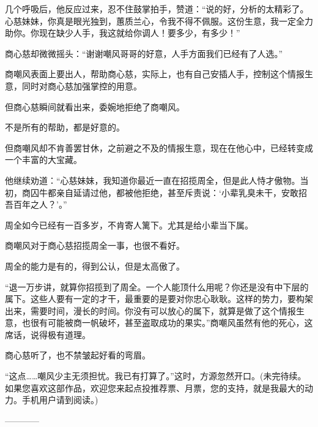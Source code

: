 \begin{this_body}
几个呼吸后，他反应过来，忍不住鼓掌拍手，赞道：“说的好，分析的太精彩了。心慈妹妹，你真是眼光独到，蕙质兰心，令我不得不佩服。这份生意，我一定全力助你。你现在缺少人手，我这就给你调人！要多少，有多少！”

商心慈却微微摇头：“谢谢嘲风哥哥的好意，人手方面我们已经有了人选。”

商嘲风表面上要出人，帮助商心慈，实际上，也有自己安插人手，控制这个情报生意，同时对商心慈加强掌控的用意。

但商心慈瞬间就看出来，委婉地拒绝了商嘲风。

不是所有的帮助，都是好意的。

但商嘲风却不肯善罢甘休，之前避之不及的情报生意，现在在他心中，已经转变成一个丰富的大宝藏。

他继续劝道：“心慈妹妹，我知道你最近一直在招揽周全，但是此人恃才傲物。当初，商囚牛都亲自延请过他，都被他拒绝，甚至斥责说：‘小辈乳臭未干，安敢招吾百年之人？’。”

周全如今已经有一百多岁，不肯寄人篱下。尤其是给小辈当下属。

商嘲风对于商心慈招揽周全一事，也很不看好。

周全的能力是有的，得到公认，但是太高傲了。

“退一万步讲，就算你招揽到了周全。一个人能顶什么用呢？你还是没有中下层的属下。这些人要有一定的才干，最重要的是要对你忠心耿耿。这样的势力，要构架出来，需要时间，漫长的时间。你没有可以放心的属下，就算是做了这个情报生意，也很有可能被商一帆破坏，甚至盗取成功的果实。”商嘲风虽然有他的死心，这席话，说得极有道理。

商心慈听了，也不禁皱起好看的弯眉。

“这点……嘲风少主无须担忧。我已有打算了。”这时，方源忽然开口。(未完待续。如果您喜欢这部作品，欢迎您来起点投推荐票、月票，您的支持，就是我最大的动力。手机用户请到阅读。)

------------

\end{this_body}

